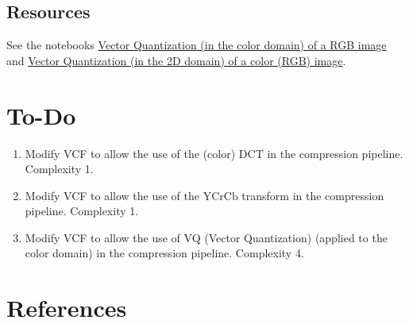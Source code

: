 \subsection*{Resources}
See the notebooks
\href{https://github.com/vicente-gonzalez-ruiz/vector_quantization/blob/main/docs/RGB_VQ.ipynb}{Vector
  Quantization (in the color domain) of a RGB image} and
\href{https://github.com/vicente-gonzalez-ruiz/vector_quantization/blob/main/docs/spatial_color_VQ.ipynb}{Vector
  Quantization (in the 2D domain) of a color (RGB) image}.

\section{To-Do}
\begin{enumerate}
\item Modify VCF to allow the use of the (color) $\text{DCT}$ in the
  compression pipeline. Complexity 1.
\item Modify VCF to allow the use of the $\text{YCrCb}$ transform in
  the compression pipeline. Complexity 1.
\item Modify VCF to allow the use of VQ (Vector Quantization) (applied to
  the color domain) in the compression pipeline. Complexity 4.
\end{enumerate}

\section{References}

\renewcommand{\addcontentsline}[3]{}%

